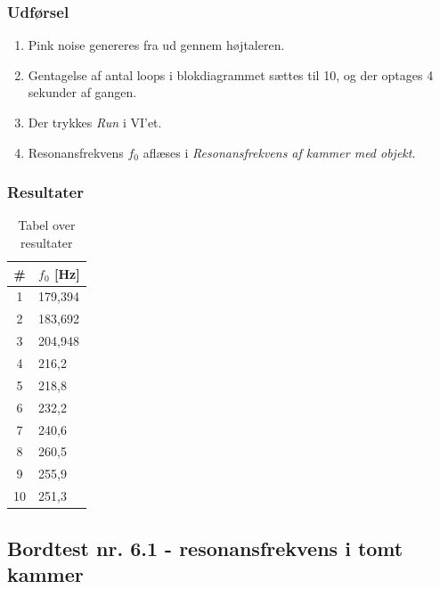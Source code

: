	
	
	\subsubsection{Udførsel}
			
			\begin{enumerate}
			\item Pink noise genereres fra \onlineg  ud gennem højtaleren. 
			\item Gentagelse af antal loops i blokdiagrammet sættes til 10, og der optages 4 sekunder af gangen. 
			\item Der trykkes \textit{Run} i VI'et. 
			\item Resonansfrekvens $f_{0}$ aflæses i \textit{Resonansfrekvens af kammer med objekt}.
			\end{enumerate}
			
	\subsubsection{Resultater}
	
	
			
		\begin{table}[htb]
\centering
\caption{Tabel over resultater}
\label{bordtest6resultater}
\begin{tabular}{c|l}
\textbf{\#}& \textbf{$f_{0}$ {[Hz]}} \\
\hline
1  &    179,394              \\
2  &    183,692             \\
3  &    204,948              \\
4  &    216,2              \\
5  &    218,8              \\
6  &    232,2              \\
7  &    240,6              \\
8  &    260,5              \\
9  &    255,9              \\
10 &    251,3             
\end{tabular}
\end{table}
			
			
			
			
	
	\subsection{Bordtest nr. 6.1 - resonansfrekvens i tomt kammer}
	
